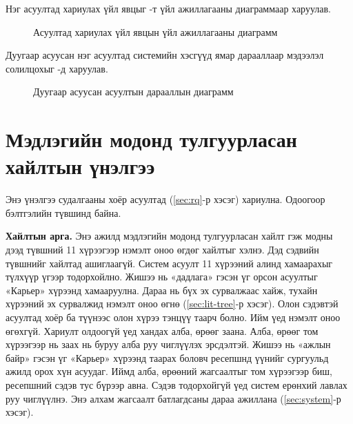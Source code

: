 Нэг асуултад хариулах үйл явцыг -т үйл ажиллагааны диаграммаар харуулав.

\begin{figure}[p]
\centering
{}
\caption{Асуултад хариулах үйл явцын үйл ажиллагааны диаграмм}
\label{fig:activity}
\end{figure}

Дуугаар асуусан нэг асуултад системийн хэсгүүд ямар дарааллаар мэдээлэл солилцохыг -д харуулав.

\begin{figure}[p]
\centering
{}
\caption{Дуугаар асуусан асуултын дарааллын диаграмм}
\label{fig:sequence}
\end{figure}

\iffull
\section{Мэдлэгийн модонд тулгуурласан хайлтын үнэлгээ}
\label{sec:exp-tree}

Энэ үнэлгээ судалгааны хоёр асуултад (\ref{sec:rq}-р хэсэг) хариулна. Одоогоор бэлтгэлийн түвшинд байна.

\textbf{Хайлтын арга.} Энэ ажилд мэдлэгийн модонд тулгуурласан хайлт гэж модны дээд түвшний 11 хүрээгээр нэмэлт оноо өгдөг хайлтыг хэлнэ. Дэд сэдвийн түвшнийг хайлтад ашиглаагүй. Систем асуулт 11 хүрээний алинд хамаарахыг түлхүүр үгээр тодорхойлно. Жишээ нь «дадлага» гэсэн үг орсон асуултыг «Карьер» хүрээнд хамааруулна. Дараа нь бүх эх сурвалжаас хайж, тухайн хүрээний эх сурвалжид нэмэлт оноо өгнө (\ref{sec:lit-tree}-р хэсэг). Олон сэдэвтэй асуултад хоёр ба түүнээс олон хүрээ тэнцүү таарч болно. Ийм үед нэмэлт оноо өгөхгүй. Хариулт олдоогүй үед хандах алба, өрөөг заана. Алба, өрөөг том хүрээгээр нь заах нь буруу алба руу чиглүүлэх эрсдэлтэй. Жишээ нь «ажлын байр» гэсэн үг «Карьер» хүрээнд таарах боловч ресепшнд үүнийг сургуульд ажилд орох хүн асуудаг. Иймд алба, өрөөний жагсаалтыг том хүрээгээр биш, ресепшний сэдэв тус бүрээр авна. Сэдэв тодорхойгүй үед систем ерөнхий лавлах руу чиглүүлнэ. Энэ алхам жагсаалт батлагдсаны дараа ажиллана (\ref{sec:system}-р хэсэг).

